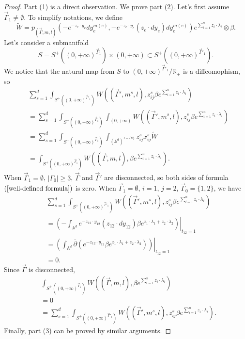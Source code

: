 \documentclass[11pt]{amsart}
\theoremstyle{definition}
\theoremstyle{remark}
\numberwithin{equation}{section}
\begin{document}
\begin{proof}
    Part (1) is a direct observation. 
    We prove part (2). Let's first assume $\vec{\Gamma}_{1}\neq\emptyset$. To simplify notations, we define
    $$
    \tilde{W}=p_{(\vec{\Gamma},m,l)}(-e^{-z_{e}\cdot y_{e}}dy_{e}^{m(e)},-e^{-z_{e}\cdot y_{e}}(z_{e}\cdot dy_{e})dy_{e}^{m(e)})e^{\sum_{i=1}^{n}z_{i}\cdot\lambda_{i}}\otimes \beta.
    $$
    Let's consider a submanifold
    $$
    S=S^{+}((0,+\infty)^{\vec{\Gamma}_{1}})\times(0,+\infty)\subset S^{+}((0,+\infty)^{\vec{\Gamma}'_{1}}).
    $$
    We notice that the natural map from $S$ to $(0,+\infty)^{\vec{\Gamma}'_{1}}/\mathbb{R}_+$ is a diffeomophism, so
    \begin{align*}
        &\sum_{s=1}^{d}\int_{S^{+}((0,+\infty)^{\vec{\Gamma}'_{1}})}W((\vec{\Gamma}',m^{s},l),z_{ij}^{s}\beta e^{\sum_{i=1}^{n}z_{i}\cdot\lambda_{i}})\\
        &=
        \sum_{s=1}^{d}\int_{S^{+}((0,+\infty)^{\vec{\Gamma}_{1}})}\int_{(0,+\infty)}W((\vec{\Gamma}',m^{s},l),z_{ij}^{s}\beta e^{\sum_{i=1}^{n}z_{i}\cdot\lambda_{i}})\\
        &=\sum_{s=1}^{d}\int_{S^{+}((0,+\infty)^{\vec{\Gamma}_{1}})}\int_{(\mathbb{A}^{d})^{ I-\{n\}}}z_{ij}^{s}x_{ij}^{s}\tilde{W}\\
        &=
        \int_{S^{+}((0,+\infty)^{\vec{\Gamma}_{1}})}W((\vec{\Gamma},m,l),\beta e^{\sum_{i=1}^{n}z_{i}\cdot\lambda_{i}}).
    \end{align*}
    When $\vec{\Gamma}_{1}=\emptyset$, $|\Gamma_{0}|\geq3$, $\vec{\Gamma}$ and $\vec{\Gamma}'$ are disconnected, so both sides of formula $(\ref{well-defined formula})$ is zero. When $\vec{\Gamma}_{1}=\emptyset$, $i=1$, $j=2$, $\vec{\Gamma}_{0}=\{1,2\}$, we have
    \begin{align*}
        &\sum_{s=1}^{d}\int_{S^{+}((0,+\infty)^{\vec{\Gamma}'_{1}})}W((\vec{\Gamma}',m^{s},l),z_{ij}^{s}\beta e^{\sum_{i=1}^{n}z_{i}\cdot\lambda_{i}})\\
        &=
        \left.\left(
        -\int_{\mathbb{A}^{d}}e^{-z_{12}\cdot y_{12}}(z_{12}\cdot dy_{12})\beta e^{z_{1}\cdot \lambda_{1}+z_{2}\cdot \lambda_{2}}
        \right)\right|_{t_{12}=1}\\
        &=
        \left.\left(
        \int_{\mathbb{A}^{d}}\bar{\partial}\left(e^{-z_{12}\cdot y_{12}}\beta e^{z_{1}\cdot \lambda_{1}+z_{2}\cdot \lambda_{2}}
        \right)\right)\right|_{t_{12}=1}\\
        &=0.
    \end{align*}
    Since $\vec{\Gamma}$ is disconnected, 
    \begin{align*}
        &\int_{S^{+}((0,+\infty)^{\vec{\Gamma}_{1}})}W((\vec{\Gamma},m,l),\beta e^{\sum_{i=1}^{n}z_{i}\cdot\lambda_{i}})\\
        &=0\\
        &=
        \sum_{s=1}^{d}\int_{S^{+}((0,+\infty)^{\vec{\Gamma}'_{1}})}W((\vec{\Gamma}',m^{s},l),z_{ij}^{s}\beta e^{\sum_{i=1}^{n}z_{i}\cdot\lambda_{i}}).
    \end{align*}
    Finally, part (3) can be proved by similar arguments.
\end{proof}
\end{document}
